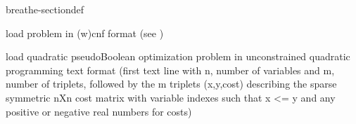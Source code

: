 \documentclass[letterpaper,10pt,openany,oneside,english]{sphinxmanual}
\begin{document}
\begin{fulllineitems}
\begin{sphinxuseclass}{breathe-sectiondef}
\begin{fulllineitems}
\label{\detokenize{ref/ref_cpp:_CPPv4N11WeightedCSP9read_wcnfEPKc}}\label{\detokenize{ref/ref_cpp:_CPPv3N11WeightedCSP9read_wcnfEPKc}}\label{\detokenize{ref/ref_cpp:_CPPv2N11WeightedCSP9read_wcnfEPKc}}\label{\detokenize{ref/ref_cpp:WeightedCSP::read_wcnf__cCP}}
\pysigstartsignatures
\pysigstartmultiline
{}
\pysigstopmultiline
\pysigstopsignatures
\sphinxAtStartPar
load problem in (w)cnf format (see ) 

\end{fulllineitems}


\begin{fulllineitems}
\label{\detokenize{ref/ref_cpp:_CPPv4N11WeightedCSP9read_qpboEPKc}}\label{\detokenize{ref/ref_cpp:_CPPv3N11WeightedCSP9read_qpboEPKc}}\label{\detokenize{ref/ref_cpp:_CPPv2N11WeightedCSP9read_qpboEPKc}}\label{\detokenize{ref/ref_cpp:WeightedCSP::read_qpbo__cCP}}
\pysigstartsignatures
\pysigstartmultiline
{}
\pysigstopmultiline
\pysigstopsignatures
\sphinxAtStartPar
load quadratic pseudo\sphinxhyphen{}Boolean optimization problem in unconstrained quadratic programming text format (first text line with n, number of variables and m, number of triplets, followed by the m triplets (x,y,cost) describing the sparse symmetric nXn cost matrix with variable indexes such that x \textless{}= y and any positive or negative real numbers for costs) 

\end{fulllineitems}


\end{sphinxuseclass}
\end{fulllineitems}
\end{document}
